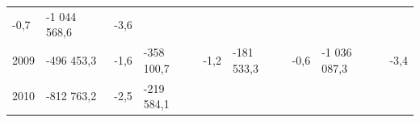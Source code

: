 \begin{longtable}[]{@{}lllllllll@{}}
\begin{minipage}[t]{0.06\columnwidth}
-0,7\strut
\end{minipage} & \begin{minipage}[t]{0.10\columnwidth}\raggedright
-1 044 568,6\strut
\end{minipage} & \begin{minipage}[t]{0.06\columnwidth}\raggedright
-3,6\strut
\end{minipage}\tabularnewline
\begin{minipage}[t]{0.05\columnwidth}\raggedright
2009\strut
\end{minipage} & \begin{minipage}[t]{0.10\columnwidth}\raggedright
-496 453,3\strut
\end{minipage} & \begin{minipage}[t]{0.06\columnwidth}\raggedright
-1,6\strut
\end{minipage} & \begin{minipage}[t]{0.16\columnwidth}\raggedright
-358 100,7\strut
\end{minipage} & \begin{minipage}[t]{0.06\columnwidth}\raggedright
-1,2\strut
\end{minipage} & \begin{minipage}[t]{0.12\columnwidth}\raggedright
-181 533,3\strut
\end{minipage} & \begin{minipage}[t]{0.06\columnwidth}\raggedright
-0,6\strut
\end{minipage} & \begin{minipage}[t]{0.10\columnwidth}\raggedright
-1 036 087,3\strut
\end{minipage} & \begin{minipage}[t]{0.06\columnwidth}\raggedright
-3,4\strut
\end{minipage}\tabularnewline
\begin{minipage}[t]{0.05\columnwidth}\raggedright
2010\strut
\end{minipage} & \begin{minipage}[t]{0.10\columnwidth}\raggedright
-812 763,2\strut
\end{minipage} & \begin{minipage}[t]{0.06\columnwidth}\raggedright
-2,5\strut
\end{minipage} & \begin{minipage}[t]{0.16\columnwidth}\raggedright
-219 584,1\strut
\end{minipage} & \begin{minipage}[t]{0.06\columnwidth}\raggedright

\end{minipage}
\end{longtable}
